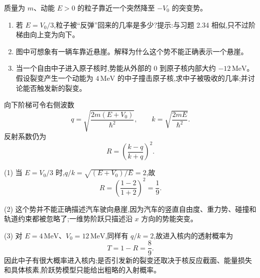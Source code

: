 \begin{question}
质量为 $m$、动能 $E>0$ 的粒子靠近一个突然降至 $-V_0$ 的突变势。
\begin{enumerate}
\item 若 $E=V_0/3$,粒子被“反弹”回来的几率是多少?提示:与习题 2.34 相似,只不过阶梯由向上变为向下。
\item 图中可想象有一辆车靠近悬崖。解释为什么这个势不能正确表示一个悬崖。
\item 当一个自由中子进入原子核时,势能从外部的 $0$ 到原子核内部大约 $-12\,\mathrm{MeV}$。假设裂变产生一个动能为 $4\,\mathrm{MeV}$ 的中子撞击原子核,求中子被吸收的几率;并讨论能否触发新的裂变。
\end{enumerate}
\begin{solution}
向下阶梯可令右侧波数
\[
q=\sqrt{\frac{2m(E+V_0)}{\hbar^2}},
\qquad
k=\sqrt{\frac{2mE}{\hbar^2}}.
\]
反射系数仍为
\[
R=\left(\frac{k-q}{k+q}\right)^2.
\]

(1) 当 $E=V_0/3$ 时,$q/k=\sqrt{(E+V_0)/E}=2$,故
\[
R=\left(\frac{1-2}{1+2}\right)^2=\frac19.
\]

(2) 这个势并不能正确描述汽车驶向悬崖,因为汽车的竖直自由度、重力势、碰撞和轨道约束都被忽略了;一维势阶跃只描述沿 $x$ 方向的势能突变。

(3) 对 $E=4\,\mathrm{MeV}$、$V_0=12\,\mathrm{MeV}$,同样有 $q/k=2$,故进入核内的透射概率为
\[
T=1-R=\frac89.
\]
因此中子有很大概率进入核内;是否引发新的裂变还取决于核反应截面、能量损失和具体核素,阶跃势模型只能给出粗略的入射概率。
\end{solution}
\end{question}

